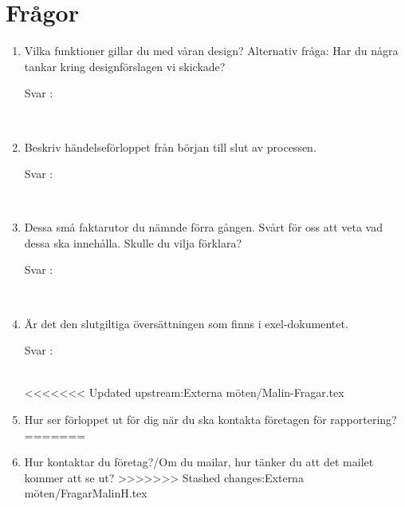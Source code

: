 \documentclass{article}
\date {#1}
\title {
    \documentTitle {Helsingborg Event and Convention Bureau}
    
    \documentDate {}
}
\begin{document}
\maketitle
\thispagestyle{empty}

\newpage




\newpage

\section{Frågor}

 
\begin{enumerate}
 \item Vilka funktioner gillar du med våran design? Alternativ fråga: Har du några tankar kring designförslagen vi skickade?
        \begin{description}
            \item[Svar :]
        \end{description}
    \\
    \item Beskriv händelseförloppet från början till slut av processen.
        \begin{description}
            \item[Svar :]
        \end{description}
    \\
    \item Dessa små faktarutor du nämnde förra gången. Svårt för oss att veta vad dessa ska innehålla. Skulle du vilja förklara?
        \begin{description}
            \item[Svar :]
        \end{description}  
    \\
     \item Är det den slutgiltiga översättningen som finns i exel-dokumentet.
        \begin{description}
            \item[Svar :]
        \end{description}
    \\
<<<<<<< Updated upstream:Externa möten/Malin-Fragar.tex
    \item Hur ser förloppet ut för dig när du ska kontakta företagen för rapportering? 
=======
    \item Hur kontaktar du företag?/Om du mailar, hur tänker du att det mailet kommer att se ut?
>>>>>>> Stashed changes:Externa möten/FragarMalinH.tex
    

\end{enumerate}
\end{document}
